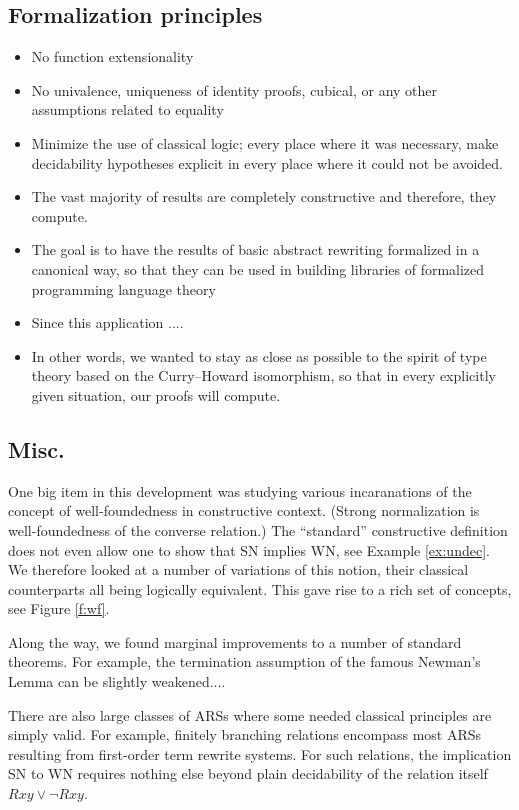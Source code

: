 \subsection{Formalization principles}


\begin{itemize}
  \item No function extensionality
  \item No univalence, uniqueness of identity proofs, cubical, or any other
  assumptions related to equality
  \item Minimize the use of classical logic; every place where it was necessary,
  make decidability hypotheses explicit in every place where it could not be avoided.
  \item The vast majority of results are completely constructive and therefore,
  they compute.
  \item The goal is to have the results of basic abstract rewriting
  formalized in a canonical way, so that they can be used in building
  libraries of formalized programming language theory
  \item Since this application ....
  \item In other words, we wanted to stay as close as possible to the spirit of type theory based on the Curry--Howard isomorphism, so that in every explicitly given situation, our proofs will compute.
\end{itemize}

\subsection{Misc.}
One big item in this development was studying various incaranations of the concept of well-foundedness in constructive context.
(Strong normalization is well-foundedness of the converse relation.)
The ``standard'' constructive definition does not even allow one to show that SN implies WN, see Example \ref{ex:undec}.  We therefore looked at a number of variations of this notion, their classical counterparts all being logically equivalent.  This gave rise to a rich set of concepts, see Figure \ref{f:wf}.

Along the way, we found marginal improvements to a number of standard theorems.
For example, the termination assumption of the famous Newman's Lemma can be slightly weakened....

There are also large classes of ARSs where some needed classical principles are simply valid.  For example, finitely branching relations encompass most ARSs resulting from first-order term rewrite systems.  For such relations, the implication SN to WN requires nothing else beyond plain decidability of
the relation itself $Rxy \lor \lnot Rxy$.

